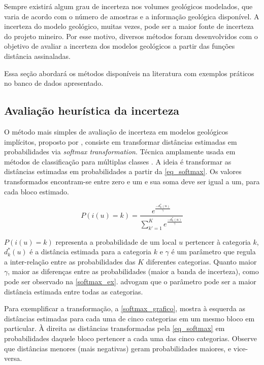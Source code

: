 Sempre existirá algum grau de incerteza nos volumes geológicos modelados, que varia de acordo com o número de amostras e a informação geológica disponível. A incerteza do modelo geológico, muitas vezes, pode ser a maior fonte de incerteza do projeto mineiro. Por esse motivo, diversos métodos foram desenvolvidos com o objetivo de avaliar a incerteza dos modelos geológicos a partir das funções distância assinaladas.

Essa seção abordará os métodos disponíveis na literatura com exemplos práticos no banco de dados apresentado.

\subsection{Avaliação heurística da incerteza}\label{heuristic}

O método mais simples de avaliação de incerteza em modelos geológicos implícitos, proposto por , consiste em transformar distâncias estimadas em probabilidades via \textit{softmax transformation}. Técnica amplamente usada em métodos de classificação para múltiplas classes \cite{mccullaghgeneralizedlinear}. A ideia é transformar as distâncias estimadas em probabilidades a partir da \autoref{eq_softmax}. Os valores transformados encontram-se entre zero e um e  sua soma deve ser igual a um, para cada bloco estimado.

\begin{equation}
	P(i(u)=k)=\frac{e^\frac{-d^*_k(u)}{\gamma}}{\sum_{k'=1}^{K}e^\frac{-d^*_k(u)}{\gamma}}
    \label{eq_softmax}
\end{equation}

$P(i(u)=k)$ representa a probabilidade de um local $u$ pertencer à categoria $k$, $d^*_k(u)$ é a distância estimada para a categoria $k$ e $\gamma$ é um parâmetro que regula a inter-relação entre as probabilidades das $K$ diferentes categorias. Quanto maior $\gamma$, maior as diferenças entre as probabilidades (maior a banda de incerteza), como pode ser observado na \autoref{softmax_ex}.  advogam que o parâmetro pode ser a maior distância estimada entre todas as categorias.

Para exemplificar a transformação, a \autoref{softmax_grafico}, mostra à esquerda as distâncias estimadas para cada uma de cinco categorias em um mesmo bloco em particular. À direita as distâncias transformadas pela \autoref{eq_softmax} em probabilidades daquele bloco pertencer a cada uma das cinco categorias. Observe que distâncias menores (mais negativas) geram probabilidades maiores, e vice-versa.  

